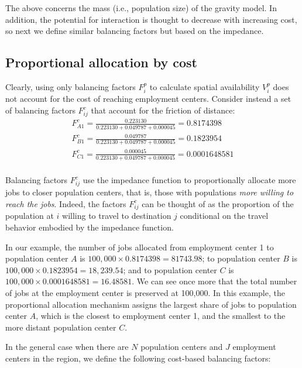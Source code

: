 \documentclass[]{elsarticle} %
\begin{document}
The above concerns the mass (i.e., population size) of the gravity
model. In addition, the potential for interaction is thought to decrease
with increasing cost, so next we define similar balancing factors but
based on the impedance.

\hypertarget{proportional-allocation-by-cost}{%
\subsection{Proportional allocation by
cost}\label{proportional-allocation-by-cost}}

Clearly, using only balancing factors \(F^p_{i}\) to calculate spatial
availability \(V^p_i\) does not account for the cost of reaching
employment centers. Consider instead a set of balancing factors
\(F^c_{ij}\) that account for the friction of distance: \[
\begin{array}{l}
F^c_{A1} = \frac{0.223130}{0.223130 + 0.049787 + 0.000045} = 0.8174398\\
F^c_{B1} = \frac{0.049787}{0.223130 + 0.049787 + 0.000045} = 0.1823954\\
F^c_{C1} = \frac{0.000045}{0.223130 + 0.049787 + 0.000045} = 0.0001648581\\
\end{array}
\]

Balancing factors \(F^c_{ij}\) use the impedance function to
proportionally allocate more jobs to closer population centers, that is,
those with populations \emph{more willing to reach the jobs}. Indeed,
the factors \(F^c_{ij}\) can be thought of as the proportion of the
population at \(i\) willing to travel to destination \(j\) conditional
on the travel behavior embodied by the impedance function.

In our example, the number of jobs allocated from employment center 1 to
population center \(A\) is \(100,000\times 0.8174398 = 81743.98\); to
population center \(B\) is \(100,000\times 0.1823954 = 18,239.54\); and
to population center \(C\) is \(100,000\times 0.0001648581 = 16.48581\).
We can see once more that the total number of jobs at the employment
center is preserved at 100,000. In this example, the proportional
allocation mechanism assigns the largest share of jobs to population
center \(A\), which is the closest to employment center 1, and the
smallest to the more distant population center \(C\).

In the general case when there are \(N\) population centers and \(J\)
employment centers in the region, we define the following cost-based
balancing factors:
\end{document}
